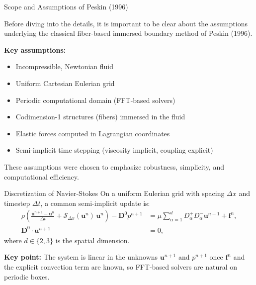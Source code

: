 \documentclass{beamer}
\begin{document}
\begin{frame}{Scope and Assumptions of Peskin (1996)}
\small

Before diving into the details, it is important to be clear about the
assumptions underlying the classical fiber-based immersed boundary method
of Peskin (1996).

\medskip
\textbf{Key assumptions:}
\begin{itemize}
    \item Incompressible, Newtonian fluid
    \item Uniform Cartesian Eulerian grid
    \item Periodic computational domain (FFT-based solvers)
    \item Codimension-1 structures (fibers) immersed in the fluid
    \item Elastic forces computed in Lagrangian coordinates
    \item Semi-implicit time stepping (viscosity implicit, coupling explicit)
\end{itemize}

\medskip
These assumptions were chosen to emphasize robustness, simplicity,
and computational efficiency.

\end{frame}

\begin{frame}{Discretization of Navier-Stokes}
\small
On a uniform Eulerian grid with spacing $\Delta x$ and timestep $\Delta t$, a common semi-implicit update is:
\begin{align*}
\rho\left(
\frac{\mathbf{u}^{n+1}-\mathbf{u}^{n}}{\Delta t}
+ \mathcal{S}_{\Delta x}(\mathbf{u}^{n})\,\mathbf{u}^{n}
\right)
- \mathbf{D}^{0} p^{n+1}
&=
\mu\sum_{\alpha=1}^{d} D^{+}_{\alpha}D^{-}_{\alpha}\mathbf{u}^{n+1}
+\mathbf{f}^{n},\\
\mathbf{D}^{0}\cdot \mathbf{u}^{n+1} &= 0,
\end{align*}
where $d\in\{2,3\}$ is the spatial dimension.

\medskip
\textbf{Key point:} The system is linear in the unknowns $\mathbf{u}^{n+1}$ and $p^{n+1}$ once $\mathbf{f}^n$ and the explicit convection term are known, so FFT-based solvers are natural on periodic boxes.
\end{frame}
\end{document}
